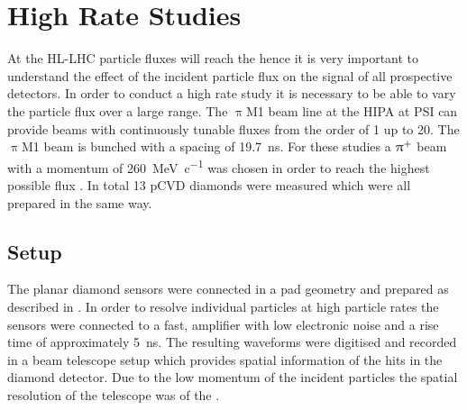 \section{High Rate Studies}
At the \ac{HL-LHC} particle fluxes will reach the  hence it is very important to understand the effect of the incident particle flux on the signal of all prospective detectors. In order to conduct a high rate study it is necessary to be able to vary the particle flux over a large range. The $\uppi$M1 beam line at the \ac{HIPA} at \ac{PSI} \cite{hipa} can provide beams with continuously tunable fluxes from the order of \SI{1}{\khzcm} up to \SI{20}{\mhzcm}. The $\uppi$M1 beam is bunched with a spacing of \SI{19.7}{\nano\second}. For these studies a $\uppi^{\text{+}}$ beam with a momentum of \SI{260}{\mega\electronvolt\per c}  was chosen in order to reach the highest possible flux \cite{pim1}. In total 13 \ac{pCVD} diamonds were measured which were all prepared in the same way.\par
\subsection{Setup}
The planar diamond sensors were connected in a pad geometry and prepared as described in \cite{felix}. 
In order to resolve individual particles at high particle rates the sensors were connected to a fast, amplifier with low electronic noise and a rise time of approximately \SI{5}{\nano\second}. The resulting waveforms were digitised and recorded in a beam telescope setup \cite{felix} which provides spatial information of the hits in the diamond detector. Due to the low momentum of the incident particles the spatial resolution of the telescope was of the .\par

